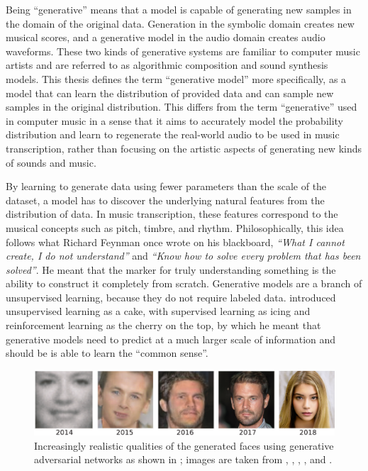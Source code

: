 Being ``generative'' means that a model is capable of generating new samples in the domain of the original data.
Generation in the symbolic domain creates new musical scores, and a generative model in the audio domain creates audio waveforms.
These two kinds of generative systems are familiar to computer music artists and are referred to as algorithmic composition \cite{fernandez2013ai} and sound synthesis \cite{cook2002synthesis} models.
This thesis defines the term ``generative model'' more specifically, as a model that can learn the distribution of provided data and can sample new samples in the original distribution.
This differs from the term ``generative'' used in computer music in a sense that it aims to accurately model the probability distribution and learn to regenerate the real-world audio to be used in music transcription, rather than focusing on the artistic aspects of generating new kinds of sounds and music.

By learning to generate data using fewer parameters than the scale of the dataset, a model has to discover the underlying natural features from the distribution of data.
In music transcription, these features correspond to the musical concepts such as pitch, timbre, and rhythm.
Philosophically, this idea follows what Richard Feynman once wrote on his blackboard, \emph{``What I cannot create, I do not understand''} and \emph{``Know how to solve every problem that has been solved''}.
He meant that the marker for truly understanding something is the ability to construct it completely from scratch.
Generative models are a branch of unsupervised learning, because they do not require labeled data.
 introduced unsupervised learning as a cake, with supervised learning as icing and reinforcement learning as the cherry on the top, by which he meant that generative models need to predict at a much larger scale of information and should be is able to learn the ``common sense''.

\begin{figure}
	\includegraphics[width=\textwidth]{generative-evolution.pdf}
	\caption{Increasingly realistic qualities of the generated faces using generative adversarial networks as shown in \protect\cite{brundage2018malicious}; images are taken from \protect\cite{goodfellow2014gan}, \protect\cite{radford2015dcgan}, \protect\cite{liu2016cogan}, \protect\cite{karras2017pggan}, and \protect\cite{karras2019stylegan}.} 
	\label{fig:generative-evolution}
\end{figure}


